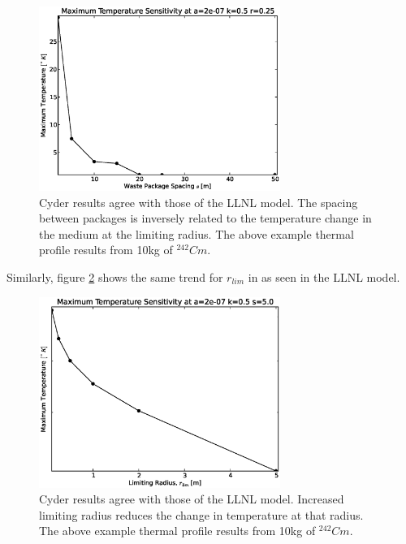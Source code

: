 \begin{figure}[htbp!]
\begin{center}
\includegraphics[width=0.7\textwidth]{./chapters/demonstration/spacing/spacing.eps}
\end{center}
\caption[Spacing Sensitivity in Cyder]
{Cyder results agree with those of the LLNL model. The spacing between packages 
is inversely related to the temperature change in the medium at the limiting 
radius. The above example thermal profile results from 10kg of $^{242}Cm$.}
\label{fig:spacing_cyder}
\end{figure}


Similarly, figure \ref{fig:r_lim_cyder} shows the same trend for $r_{lim}$ in \Cyder as seen in the LLNL model.

\begin{figure}[htbp!]
\begin{center}
\includegraphics[width=0.7\textwidth]{./chapters/demonstration/spacing/lim_radius.eps}
\end{center}
\caption[$r_{lim}$ Sensitivity in Cyder]
{Cyder results agree with those of the LLNL model. Increased limiting radius 
reduces the change in temperature at that radius. The above example thermal 
profile results from 10kg of $^{242}Cm$.}
\label{fig:r_lim_cyder}
\end{figure}



